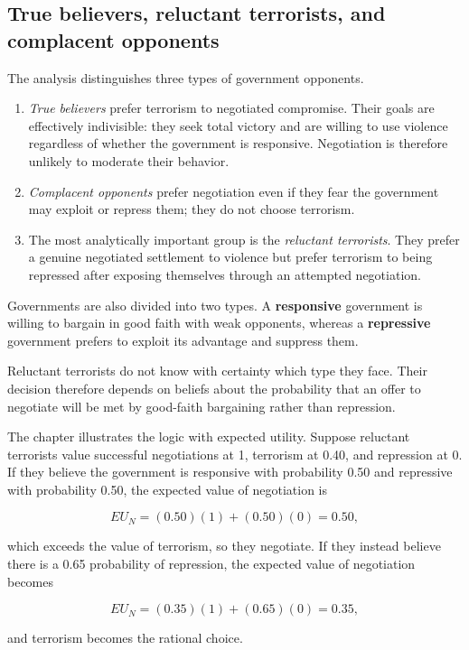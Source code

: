 \subsection{True believers, reluctant terrorists, and complacent opponents}

The analysis distinguishes three types of government opponents.
\begin{enumerate}
    \item \textit{True believers} prefer terrorism to negotiated compromise. Their goals are effectively indivisible: they seek total victory and are willing to use violence regardless of whether the government is responsive. Negotiation is therefore unlikely to moderate their behavior.
    \item \textit{Complacent opponents} prefer negotiation even if they fear the government may exploit or repress them; they do not choose terrorism.
    \item The most analytically important group is the \textit{reluctant terrorists}. They prefer a genuine negotiated settlement to violence but prefer terrorism to being repressed after exposing themselves through an attempted negotiation.
\end{enumerate}

Governments are also divided into two types. A \textbf{responsive} government is willing to bargain in good faith with weak opponents, whereas a \textbf{repressive} government prefers to exploit its advantage and suppress them.

Reluctant terrorists do not know with certainty which type they face. Their decision therefore depends on beliefs about the probability that an offer to negotiate will be met by good-faith bargaining rather than repression.

The chapter illustrates the logic with expected utility. Suppose reluctant terrorists value successful negotiations at 1, terrorism at 0.40, and repression at 0. If they believe the government is responsive with probability 0.50 and repressive with probability 0.50, the expected value of negotiation is

\[
EU_{N}=(0.50)(1)+(0.50)(0)=0.50,
\]

which exceeds the value of terrorism, so they negotiate. If they instead believe there is a 0.65 probability of repression, the expected value of negotiation becomes

\[
EU_{N}=(0.35)(1)+(0.65)(0)=0.35,
\]

and terrorism becomes the rational choice.

